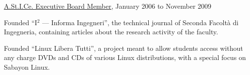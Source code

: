 \documentclass[10pt]{article}
\renewcommand{\section}[2]%
        {\pagebreak[3]\vspace{1.3\baselineskip}%
         \phantomsection\addcontentsline{toc}{section}{#1}%
         \hspace{0in}%
         \marginpar{
         \raggedright \scshape #1}#2}
\newenvironment{innerlist}[1][\enskip\textbullet]%
        {\begin{compactitem}[#1]}{\end{compactitem}}
\newcommand{\halfblankline}{\quad\vspace{-0.5\baselineskip}\pagebreak[3]}
\begin{document}
\halfblankline

\href{http://www.astice.org/}{A.St.I.Ce. Executive Board Member}, January 2006 to November 2009
    \begin{innerlist}
      \item Founded ``I$^2$ --- Informa Ingegneri'', the technical journal of Seconda Facoltà di Ingegneria, containing articles about the research activity of the faculty.
      \item Founded ``Linux Libera Tutti'', a project meant to allow students access without any charge DVDs and CDs of various Linux distributions, with a special focus on Sabayon Linux.
    \end{innerlist}
\halfblankline

% 
% 
% 
% 
% 



\let\thefootnote\relax\footnotetext{\today}
\end{document}
